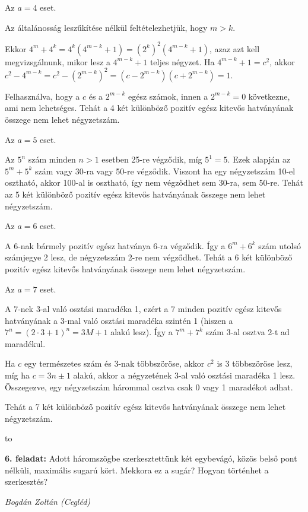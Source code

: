 \documentclass[a4paper,10pt]{article}
\newcommand{\ki}[2]{\hfill {\it #1 (#2)}\medskip}
\newcommand{\vonal}{\hbox to \hsize{\hskip2truecm\hrulefill\hskip2truecm}}
\begin{document}
\medskip\newpage
Az $a = 4$ eset.

Az általánosság leszűkítése nélkül
feltételezhetjük, hogy $m>k$.

Ekkor $4^m+4^k = 4^k\left(4^{m-k}+1\right) = \left(2^k\right)^2\left(4^{m-k}+1\right)$, azaz azt kell megvizsgálnunk, mikor lesz a 
$4^{m-k}+1$ teljes négyzet. 
Ha $4^{m-k}+1=c^2$, akkor $c^2-4^{m-k} = c^2 -\left(2^{m-k}\right)^2
= \left(c-2^{m-k}\right)\left(c+2^{m-k}\right) = 1$.

Felhasználva, hogy a $c$ és a $2^{m-k}$ egész számok, 
innen a $2^{m-k} = 0$ következne, ami nem
lehetséges. Tehát a 4 két különböző pozitív egész kitevős hatványának összege nem lehet
négyzetszám.

\medskip
Az $a = 5$ eset.

Az $5^n$ szám minden $n > 1$ esetben 25-re végződik, míg $5^1 = 5$. Ezek alapján az $5^m+5^k$ szám
vagy 30-ra vagy 50-re végződik. Viszont ha egy négyzetszám 10-el osztható, akkor 100-al is
osztható, így nem végződhet sem 30-ra, sem 50-re. Tehát az 5 két különböző pozitív egész
kitevős hatványának összege nem lehet négyzetszám.

\medskip
Az $a = 6$ eset.

A 6-nak bármely pozitív egész hatványa 6-ra végződik. Így a 
$6^m+6^k$ szám utolsó számjegye
2 lesz, de négyzetszám 2-re nem végződhet. Tehát a 6 két különböző pozitív egész kitevős
hatványának összege nem lehet négyzetszám.

\medskip
Az $a = 7$ eset.

A 7-nek 3-al való osztási maradéka 1, ezért a 7 minden pozitív egész kitevős hatványának a
3-mal való osztási maradéka szintén 1 
(hiszen a $7^n = \left( 2 \cdot  3 + 1\right)^n = 3 M + 1$ alakú lesz). Így a $7^m + 7^k$ szám 3-al osztva 2-t ad maradékul.

Ha $c$ egy természetes szám és 3-nak többszöröse, akkor $c^2$ is 3 többszöröse lesz, míg ha
$c = 3 n \pm 1$ alakú, akkor a négyzetének 3-al való osztási maradéka 1 lesz. Összegezve, egy
négyzetszám hárommal osztva csak 0 vagy 1 maradékot adhat.

Tehát a 7 két különböző pozitív egész kitevős hatványának összege nem lehet négyzetszám.

\medskip
\vonal


{\bf 6. feladat:} Adott háromszögbe szerkesztettünk két egybevágó, közös belső pont
nélküli, maximális sugarú kört. Mekkora ez a sugár? Hogyan történhet a szerkesztés?


\ki{Bogdán Zoltán }{Cegléd}\medskip
\end{document}
